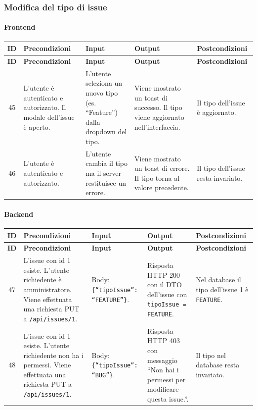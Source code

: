 \subsubsection{Modifica del tipo di issue}

\paragraph{Frontend}

{
\small
\begin{longtable}{|c|p{3.8cm}|p{3.8cm}|p{3.8cm}|p{3.8cm}|}
\hline
\textbf{ID} & \textbf{Precondizioni} & \textbf{Input} & \textbf{Output} & \textbf{Postcondizioni} \\
\hline
\endfirsthead
\hline
\textbf{ID} & \textbf{Precondizioni} & \textbf{Input} & \textbf{Output} & \textbf{Postcondizioni} \\
\hline
\endhead
45 &
L'utente \`e autenticato e autorizzato. Il modale dell'issue \`e aperto. &
L'utente seleziona un nuovo tipo (es. ``Feature'') dalla dropdown del tipo. &
Viene mostrato un toast di successo. Il tipo viene aggiornato nell'interfaccia. &
Il tipo dell'issue \`e aggiornato. \\
\hline
46 &
L'utente \`e autenticato e autorizzato. &
L'utente cambia il tipo ma il server restituisce un errore. &
Viene mostrato un toast di errore. Il tipo torna al valore precedente. &
Il tipo dell'issue resta invariato. \\
\hline
\end{longtable}
}

\paragraph{Backend}

{
\small
\begin{longtable}{|c|p{3.8cm}|p{3.8cm}|p{3.8cm}|p{3.8cm}|}
\hline
\textbf{ID} & \textbf{Precondizioni} & \textbf{Input} & \textbf{Output} & \textbf{Postcondizioni} \\
\hline
\endfirsthead
\hline
\textbf{ID} & \textbf{Precondizioni} & \textbf{Input} & \textbf{Output} & \textbf{Postcondizioni} \\
\hline
\endhead
47 &
L'issue con id 1 esiste. L'utente richiedente \`e amministratore. Viene effettuata una richiesta PUT a \texttt{/api/issues/1}. &
Body: \texttt{\{``tipoIssue'': ``FEATURE''\}}. &
Risposta HTTP 200 con il DTO dell'issue con \texttt{tipoIssue = FEATURE}. &
Nel database il tipo dell'issue 1 \`e \texttt{FEATURE}. \\
\hline
48 &
L'issue con id 1 esiste. L'utente richiedente non ha i permessi. Viene effettuata una richiesta PUT a \texttt{/api/issues/1}. &
Body: \texttt{\{``tipoIssue'': ``BUG''\}}. &
Risposta HTTP 403 con messaggio ``Non hai i permessi per modificare questa issue.''. &
Il tipo nel database resta invariato. \\
\hline
\end{longtable}
}


